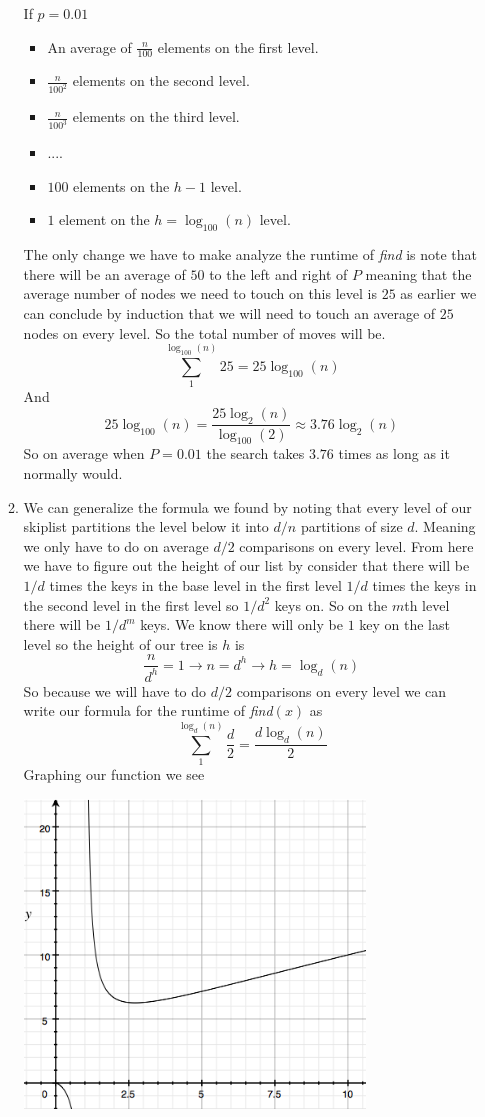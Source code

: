 \documentclass[11pt]{article}
\begin{document}
\begin{enumerate}
\begin{enumerate}
\begin{itemize}
		\end{itemize}
		If $p = 0.01$ 
		\begin{itemize}
		\item An average of $\frac{n}{100}$ elements on the first level.
		\item $\frac{n}{100^2}$ elements on the second level.
		\item $\frac{n}{100^3}$ elements on the third level.
		\item ....
		\item $100$ elements on the $h -1$ level.
		\item $1$ element on the $h = \log_{100}(n)$ level.
		\end{itemize}
			The only change we have to make analyze the runtime
			of \textit{find} is note that there will be an average
			of $50$ to the left and right of $P$ meaning that the
			average number of nodes we need to touch on this level
			is $25$ as earlier we can conclude by induction that we
			will need to touch an average of $25$ nodes on every
			level. So the total number of moves will be.
				$$\sum_1^{\log_{100}(n)}25 = 25\log_{100}(n) $$
			And 
			$$25\log_{100}(n) = \frac{25 \log_2(n)}{\log_{100}(2)}
			\approx 3.76\log_2(n)$$
			So on average when $P = 0.01$ the search takes $3.76$
			times as long as it normally would.
		\item We can generalize the formula we found by noting that every level of
			our skiplist partitions the level below it into $d/n$
			partitions of size $d$. Meaning we only have to do on
			average $d/2$ comparisons on every level. 
			From here we have to figure out the height of our list
			by consider that there will be $1/d$ times the keys in
			the base level in the first level $1/d$ times the keys
			in the second level in the first level so $1/d^2$ keys
			on. So on the $m$th level there will be $1/d^m$ keys.
			We know there will only be $1$ key on the last level so
			the height of our tree is $h$ is
			$$\frac{n}{d^h} = 1 \rightarrow n = d^h \rightarrow h = \log_d(n)$$
			So because we will have to do $d/2$ comparisons on every
			level we can write our formula for the runtime of
			\textit{find}$(x)$ as 
			$$\sum_1^{\log_d(n)}\frac{d}{2}= \frac{d\log_d(n)}{2}$$
			Graphing our function we see
		\begin{center}
		\includegraphics[width=0.75\textwidth]{images/fig3}

\end{center}
\end{enumerate}
\end{enumerate}
\end{document}
